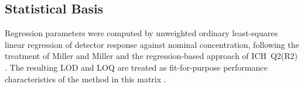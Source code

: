 \subsection{Statistical Basis}
Regression parameters were computed by unweighted ordinary least-squares linear
regression of detector response against nominal concentration, following the
treatment of Miller and Miller \citep{millermiller2018} and the regression-based
approach of ICH~Q2(R2) \citep{ich2023q2r2}. The resulting LOD and LOQ are treated as
fit-for-purpose performance characteristics of the method in this matrix
\citep{eurachem2014}.
